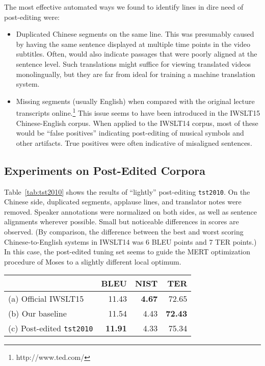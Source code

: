 {The most effective automated ways we found to identify lines in dire need of post-editing were:
\begin{itemize}
\item 
Duplicated Chinese segments on the same line. 
This was presumably caused by having the same sentence displayed at multiple time points in the video subtitles. 
Often, would also indicate passages that were poorly aligned at the sentence level.
Such translations might suffice for viewing translated videos monolingually, but they are far from ideal for training a machine translation system.

\item 
Missing segments (usually English) when compared with the original lecture transcripts online.\footnote{http://www.ted.com/} 
This issue seems to have been introduced in the IWSLT15 Chinese-English corpus. 
When applied to the IWSLT14 corpus, most of these would be ``false positives'' indicating post-editing of musical symbols and other artifacts.
True positives were often indicative of misaligned sentences.
\end{itemize}



\subsection{Experiments on Post-Edited Corpora}
\label{subsec:post_edited}

Table~\ref{tab:tst2010} shows the results of ``lightly'' post-editing {\small \tt tst2010}. 
On the Chinese side, duplicated segments, applause lines, and translator notes were removed. 
Speaker annotations were normalized on both sides, as well as sentence alignments wherever possible.
Small but noticeable differences in scores are observed. 
(By comparison, the difference between the best and worst scoring Chinese-to-English systems in IWSLT14  was 6 BLEU points and 7 TER points.)
In this case, the post-edited tuning set seems to guide the MERT optimization procedure of Moses to a slightly different local optimum.

\begin{table}[ht]
\centering
\begin{tabular}{|l|r|r|r|}
\hline
                    & BLEU  & NIST & TER    \\ \hline
(a) Official IWSLT15    & 11.43 & \textbf{4.67} & 72.65  \\ \hline
(b) Our baseline        & 11.54 & 4.43 & \textbf{72.43} \\ \hline
(c) Post-edited {\small \tt tst2010} & \textbf{11.91} & 4.33 & 75.34 \\ \hline
\end{tabular}


\end{table}}
